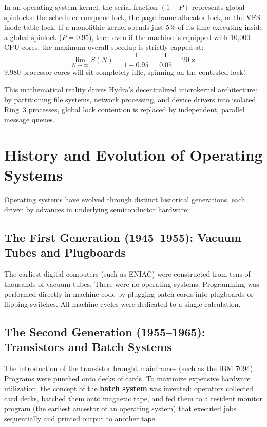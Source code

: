 In an operating system kernel, the serial fraction $(1 - P)$ represents global spinlocks: the scheduler runqueue lock, the page frame allocator lock, or the VFS inode table lock. If a monolithic kernel spends just 5\% of its time executing inside a global spinlock ($P = 0.95$), then even if the machine is equipped with 10,000 CPU cores, the maximum overall speedup is strictly capped at:
\[
    \lim_{N \to \infty} S(N) = \frac{1}{1 - 0.95} = \frac{1}{0.05} = 20\times
\]
9,980 processor cores will sit completely idle, spinning on the contested lock!

This mathematical reality drives Hydra's decentralized microkernel architecture: by partitioning file systems, network processing, and device drivers into isolated Ring~3 processes, global lock contention is replaced by independent, parallel message queues.

\section{History and Evolution of Operating Systems}
\label{sec:history_os}

Operating systems have evolved through distinct historical generations, each driven by advances in underlying semiconductor hardware:

\subsection{The First Generation (1945--1955): Vacuum Tubes and Plugboards}
The earliest digital computers (such as ENIAC) were constructed from tens of thousands of vacuum tubes. There were no operating systems. Programming was performed directly in machine code by plugging patch cords into plugboards or flipping switches. All machine cycles were dedicated to a single calculation.

\subsection{The Second Generation (1955--1965): Transistors and Batch Systems}
The introduction of the transistor brought mainframes (such as the IBM 7094). Programs were punched onto decks of cards. To maximize expensive hardware utilization, the concept of the \textbf{batch system} was invented: operators collected card decks, batched them onto magnetic tape, and fed them to a resident monitor program (the earliest ancestor of an operating system) that executed jobs sequentially and printed output to another tape.


